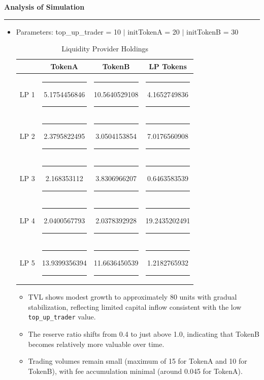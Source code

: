 \documentclass[a4paper]{article}
\newenvironment{solution}[2][]{%
\begin{mdframed}[linecolor=blue!70!black, linewidth=2pt, roundcorner=10pt, backgroundcolor=yellow!10!white, skipabove=12pt, skipbelow=12pt]%
	\textbf{\large #2}
	\par\noindent\rule{\textwidth}{0.4pt}
}{
\end{mdframed}
}
\begin{document}
\clearpage
\begin{solution}{Analysis of Simulation}
\begin{itemize}
	\item Parameters: top\_up\_trader = 10 $|$ initTokenA = 20 $|$ initTokenB = 30 
	 \begin{figure}[H]
		\centering
	\end{figure}
	\begin{table}[H]
		\centering
		\begin{tabular}{|c|c|c|c|}
		\hline
		\textbf{\rule{0pt}{1.2em}Liquidity Provider} & \textbf{TokenA} & \textbf{TokenB} & \textbf{LP Tokens} \\ \hline
		LP 1 & \rule{0.5em}{0pt}5.1754456846\rule{0.5em}{0pt} & \rule{0.5em}{0pt}10.5640529108\rule{0.5em}{0pt} & \rule{0.5em}{0pt}4.1652749836\rule{0.5em}{0pt} \\ \hline
		LP 2 & \rule{0.5em}{0pt}2.3795822495\rule{0.5em}{0pt} & \rule{0.5em}{0pt}3.0504153854\rule{0.5em}{0pt} & \rule{0.5em}{0pt}7.0176560908\rule{0.5em}{0pt} \\ \hline
		LP 3 & \rule{0.5em}{0pt}2.168353112\rule{0.5em}{0pt} & \rule{0.5em}{0pt}3.8306966207\rule{0.5em}{0pt} & \rule{0.5em}{0pt}0.6463583539\rule{0.5em}{0pt} \\ \hline
		LP 4 & \rule{0.5em}{0pt}2.0400567793\rule{0.5em}{0pt} & \rule{0.5em}{0pt}2.0378392928\rule{0.5em}{0pt} & \rule{0.5em}{0pt}19.2435202491\rule{0.5em}{0pt} \\ \hline
		LP 5 & \rule{0.5em}{0pt}13.9399356394\rule{0.5em}{0pt} & \rule{0.5em}{0pt}11.6636450539\rule{0.5em}{0pt} & \rule{0.5em}{0pt}1.2182765932\rule{0.5em}{0pt} \\ \hline
		\end{tabular}
		\caption{Liquidity Provider Holdings}
		\end{table}
		\begin{itemize}
				\item TVL shows modest growth to approximately 80 units with gradual stabilization, reflecting limited capital inflow consistent with the low \texttt{top\_up\_trader} value.
				\item The reserve ratio shifts from 0.4 to just above 1.0, indicating that TokenB becomes relatively more valuable over time.
				\item Trading volumes remain small (maximum of 15 for TokenA and 10 for TokenB), with fee accumulation minimal (around 0.045 for TokenA).
	  

\end{itemize}
\end{itemize}
\end{solution}
\end{document}
